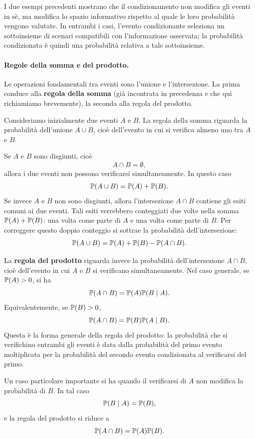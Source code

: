 I due esempi precedenti mostrano che il condizionamento non modifica gli
eventi in s\`{e}, ma modifica lo spazio informativo rispetto al quale le loro
probabilit\`{a} vengono valutate. In entrambi i casi, l'evento condizionante
seleziona un sottoinsieme di scenari compatibili con l'informazione osservata;
la probabilit\`{a} condizionata \`{e} quindi una probabilit\`{a} relativa a
tale sottoinsieme.

\paragraph*{Regole della somma e del prodotto.}
Le operazioni fondamentali tra eventi sono l'unione e l'intersezione. 
La prima conduce alla \textbf{regola della somma} (gi\`{a} incontrata in precedenza e che qui richiamiamo brevemente), la seconda alla regola del prodotto.

Consideriamo inizialmente due eventi $A$ e $B$. 
La regola della somma riguarda la probabilit\`{a} dell'unione $A\cup B$, cio\`{e} dell'evento in cui si verifica almeno uno tra $A$ e $B$.

Se $A$ e $B$ sono disgiunti, cio\`{e}
\[
A\cap B=\emptyset,
\]
allora i due eventi non possono verificarsi simultaneamente. In questo caso
\[
\mathbb{P}(A\cup B)=\mathbb{P}(A)+\mathbb{P}(B).
\]
Se invece $A$ e $B$ non sono disgiunti, allora l'intersezione $A\cap B$ contiene gli esiti comuni ai due eventi. Tali esiti verrebbero conteggiati due volte nella somma $\mathbb{P}(A)+\mathbb{P}(B)$: una volta come parte di $A$ e una volta come parte di $B$. Per correggere questo doppio conteggio si sottrae la probabilit\`{a} dell'intersezione:
\[
\mathbb{P}(A\cup B)
=
\mathbb{P}(A)+\mathbb{P}(B)-\mathbb{P}(A\cap B).
\]

La \textbf{regola del prodotto} riguarda invece la probabilit\`{a} dell'intersezione $A\cap B$, cio\`{e} dell'evento in cui $A$ e $B$ si verificano simultaneamente. 
Nel caso generale, se $\mathbb{P}(A)>0$, si ha
\[
\mathbb{P}(A\cap B)
=
\mathbb{P}(A)\mathbb{P}(B\mid A).
\]
Equivalentemente, se $\mathbb{P}(B)>0$,
\[
\mathbb{P}(A\cap B)
=
\mathbb{P}(B)\mathbb{P}(A\mid B).
\]
Questa \`{e} la forma generale della regola del prodotto: la probabilit\`{a} che si verifichino entrambi gli eventi \`{e} data dalla probabilit\`{a} del primo evento moltiplicata per la probabilit\`{a} del secondo evento condizionata al verificarsi del primo.

Un caso particolare importante si ha quando il verificarsi di $A$ non modifica la probabilit\`{a} di $B$. In tal caso
\[
\mathbb{P}(B\mid A)=\mathbb{P}(B),
\]
e la regola del prodotto si riduce a
\[
\mathbb{P}(A\cap B)
=
\mathbb{P}(A)\mathbb{P}(B).
\]

